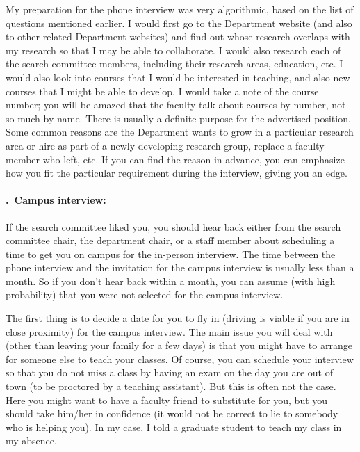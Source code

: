 \documentclass[14pt]{article}
\newcounter{myparagraph}
\renewcommand{\themyparagraph}{\arabic{myparagraph}}
\newcommand{\nparagraph}[1]{%
  \refstepcounter{myparagraph}%
  \paragraph{\themyparagraph.~#1}%
}
\begin{document}
My preparation for the phone interview was very algorithmic, based on the list of questions mentioned earlier. I would first go to the Department website (and also to other related Department websites) and find out whose research overlaps with my research so that I may be able to collaborate. I would also research each of the search committee members, including their research areas, education, etc. I would also look into courses that I would be interested in teaching, and also new courses that I might be able to develop. I would take a note of the course number; you will be amazed that the faculty talk about courses by number, not so much by name. There is usually a definite purpose for the advertised position. Some common reasons are the Department wants to grow in a particular research area or hire as part of a newly developing research group, replace a faculty member who left, etc. If you can find the reason in advance, you can emphasize how you fit the particular requirement during the interview, giving you an edge. 


\nparagraph{Campus interview:}
If the search committee liked you, you should hear back either from the search committee chair, the department chair, or a staff member about scheduling a time to get you on campus for the in-person interview. The time between the phone interview and the invitation for the campus interview is usually less than a month. So if you don't hear back within a month, you can assume (with high probability) that you were not selected for the campus interview.

The first thing is to decide a date for you to fly in (driving is viable if you are in close proximity) for the campus interview. The main issue you will deal with (other than leaving your family for a few days) is that you might have to arrange for someone else to teach your classes. Of course, you can schedule your interview so that you do not miss a class by having an exam on the day you are out of town (to be proctored by a teaching assistant). But this is often not the case. Here you might want to have a faculty friend to substitute for you, but you should take him/her in confidence (it would not be correct to lie to somebody who is helping you). In my case, I told a graduate student to teach my class in my absence. %
\end{document}
